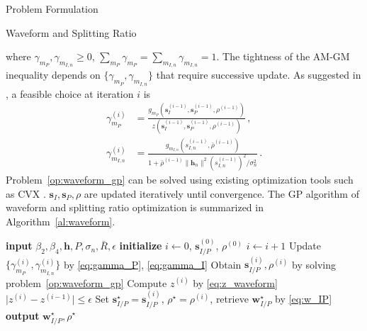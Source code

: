 \documentclass[journal]{IEEEtran}
\begin{document}
\begin{section}{Problem Formulation}
\begin{subsection}{Waveform and Splitting Ratio}
\begin{mini!}
			\end{mini!}
			where $\gamma_{m_P},\gamma_{m_{I,n}} \ge 0$, $\sum_{m_P}\gamma_{m_P}=\sum_{m_{I,n}}\gamma_{m_{I,n}}=1$. The tightness of the AM-GM inequality depends on $\{\gamma_{m_P},\gamma_{m_{I,n}}\}$ that require successive update. As suggested in \cite{Clerckx2018b}, a feasible choice at iteration $i$ is
			\begin{align}
				\gamma_{m_P}^{(i)} & = \frac{g_{m_P}(\boldsymbol{s}_I^{(i-1)},\boldsymbol{s}_P^{(i-1)},\rho^{(i-1)})}{z(\boldsymbol{s}_I^{(i-1)},\boldsymbol{s}_P^{(i-1)},\rho^{(i-1)})}\label{eq:gamma_P}\,,\\
				\gamma_{m_{I,n}}^{(i)} & = \frac{g_{m_{I,n}}(s_{I,n}^{(i-1)},\bar{\rho}^{(i-1)})}{1+{\bar{\rho}^{(i-1)}\lVert{\boldsymbol{h}_n}\rVert^2 (s_{I,n}^{(i-1)})^2}/{\sigma_n^2}}\,.\label{eq:gamma_I}
			\end{align}
			Problem~\ref{op:waveform_gp} can be solved using existing optimization tools such as CVX \cite{Grant2013}. $\boldsymbol{s}_I,\boldsymbol{s}_P,\rho$ are updated iteratively until convergence. The GP algorithm of waveform and splitting ratio optimization is summarized in Algorithm~\ref{al:waveform}.
			\begin{algorithm}[!t]
				\caption{GP: Waveform and Splitting Ratio.}
				\label{al:waveform}
				\begin{algorithmic}[1]
					\State \textbf{input} $\beta_2,\beta_4,\boldsymbol{h},P,\sigma_n,\bar{R},\epsilon$
					\State \textbf{initialize} $i \gets 0$, $\boldsymbol{s}_{I/P}^{(0)}$, $\rho^{(0)}$
					\Repeat
						\State $i \gets i + 1$
						\State Update $\{\gamma_{m_P}^{(i)},\gamma_{m_{I,n}}^{(i)}\}$ by \ref{eq:gamma_P}, \ref{eq:gamma_I}
						\State Obtain $\boldsymbol{s}_{I/P}^{(i)},\rho^{(i)}$ by solving problem~\ref{op:waveform_gp}
						\State Compute $z^{(i)}$ by \ref{eq:z_waveform}
					\Until $\lvert z^{(i)} - z^{(i-1)} \rvert \le \epsilon$
					\State Set $\boldsymbol{s}_{I/P}^{\star}=\boldsymbol{s}_{I/P}^{(i)}$, $\rho^{\star}=\rho^{(i)}$, retrieve $\boldsymbol{w}_{I/P}^{\star}$ by \ref{eq:w_IP}
					\State \textbf{output} $\boldsymbol{w}_{I/P}^{\star}, \rho^{\star}$
				\end{algorithmic}
			\end{algorithm}
		\end{subsection}



\end{section}
\end{document}
